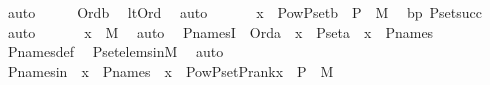 \begin{isabellebody}
\ auto\isanewline
\ \ \isamarkupfalse%
\ \isamarkupfalse%
\ {\isachardoublequoteopen}Ord{\isacharparenleft}{\kern0pt}b{\isacharparenright}{\kern0pt}{\isachardoublequoteclose}\ \isamarkupfalse%
\ lt{\isacharunderscore}{\kern0pt}Ord\ \isamarkupfalse%
\ auto\ \isanewline
\ \ \isamarkupfalse%
\ \isamarkupfalse%
\ {\isachardoublequoteopen}x\ {\isasymin}\ Pow{\isacharparenleft}{\kern0pt}P{\isacharunderscore}{\kern0pt}set{\isacharparenleft}{\kern0pt}b{\isacharparenright}{\kern0pt}\ {\isasymtimes}\ P{\isacharparenright}{\kern0pt}\ {\isasyminter}\ M{\isachardoublequoteclose}\ \isamarkupfalse%
\ bp\ P{\isacharunderscore}{\kern0pt}set{\isacharunderscore}{\kern0pt}succ\ \isamarkupfalse%
\ auto\ \isanewline
\ \ \isamarkupfalse%
\ \isamarkupfalse%
\ {\isachardoublequoteopen}x\ {\isasymin}\ M{\isachardoublequoteclose}\ \isamarkupfalse%
\ auto\ \isanewline
{}\isamarkupfalse%
%
\endisatagproof
{\isafoldproof}%
%
\isadelimproof
\isanewline
%
\endisadelimproof
\isanewline
{}\isamarkupfalse%
\ P{\isacharunderscore}{\kern0pt}namesI\ {\isacharcolon}{\kern0pt}\ {\isachardoublequoteopen}Ord{\isacharparenleft}{\kern0pt}a{\isacharparenright}{\kern0pt}\ {\isasymLongrightarrow}\ x\ {\isasymin}\ P{\isacharunderscore}{\kern0pt}set{\isacharparenleft}{\kern0pt}a{\isacharparenright}{\kern0pt}\ {\isasymLongrightarrow}\ x\ {\isasymin}\ P{\isacharunderscore}{\kern0pt}names{\isachardoublequoteclose}\ \isanewline
%
\isadelimproof
\ \ %
\endisadelimproof
%
\isatagproof
{}\isamarkupfalse%
\ P{\isacharunderscore}{\kern0pt}names{\isacharunderscore}{\kern0pt}def\ \isamarkupfalse%
\ P{\isacharunderscore}{\kern0pt}set{\isacharunderscore}{\kern0pt}elems{\isacharunderscore}{\kern0pt}in{\isacharunderscore}{\kern0pt}M\ \isamarkupfalse%
\ auto%
\endisatagproof
{\isafoldproof}%
%
\isadelimproof
\isanewline
%
\endisadelimproof
\isanewline
{}\isamarkupfalse%
\ P{\isacharunderscore}{\kern0pt}names{\isacharunderscore}{\kern0pt}in\ {\isacharcolon}{\kern0pt}\ {\isachardoublequoteopen}x\ {\isasymin}\ P{\isacharunderscore}{\kern0pt}names\ {\isasymLongrightarrow}\ x\ {\isasymin}\ Pow{\isacharparenleft}{\kern0pt}P{\isacharunderscore}{\kern0pt}set{\isacharparenleft}{\kern0pt}P{\isacharunderscore}{\kern0pt}rank{\isacharparenleft}{\kern0pt}x{\isacharparenright}{\kern0pt}{\isacharparenright}{\kern0pt}\ {\isasymtimes}\ P{\isacharparenright}{\kern0pt}\ {\isasyminter}\ M{\isachardoublequoteclose}\ \isanewline

\end{isabellebody}
